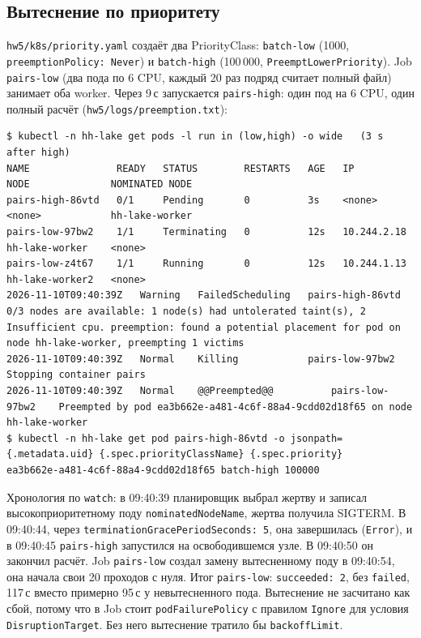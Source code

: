 \documentclass[11pt,a4paper]{article}
\DeclareRobustCommand{\code}[1]{\begingroup\renewcommand{\_}{\textunderscore\allowbreak}\renewcommand{\slash}{/\allowbreak}\texttt{#1}\endgroup}
\newcommand{\logf}[1]{\code{hw5\slash logs\slash #1}}
\begin{document}
\subsection{Вытеснение по приоритету}

\code{hw5/k8s/priority.yaml} создаёт два PriorityClass: \code{batch-low} (1000, \code{preemptionPolicy: Never}) и \code{batch-high} (100\,000, \code{PreemptLowerPriority}). Job \code{pairs-low} (два пода по 6 CPU, каждый 20 раз подряд считает полный файл) занимает оба worker. Через 9\,с запускается \code{pairs-high}: один под на 6 CPU, один полный расчёт (\logf{10\_preemption.txt}):
\begin{lstlisting}
$ kubectl -n hh-lake get pods -l run in (low,high) -o wide   (3 s after high)
NAME               READY   STATUS        RESTARTS   AGE   IP            NODE              NOMINATED NODE
pairs-high-86vtd   0/1     Pending       0          3s    <none>        <none>            hh-lake-worker
pairs-low-97bw2    1/1     Terminating   0          12s   10.244.2.18   hh-lake-worker    <none>
pairs-low-z4t67    1/1     Running       0          12s   10.244.1.13   hh-lake-worker2   <none>
2026-11-10T09:40:39Z   Warning   FailedScheduling   pairs-high-86vtd   0/3 nodes are available: 1 node(s) had untolerated taint(s), 2 Insufficient cpu. preemption: found a potential placement for pod on node hh-lake-worker, preempting 1 victims
2026-11-10T09:40:39Z   Normal    Killing            pairs-low-97bw2    Stopping container pairs
2026-11-10T09:40:39Z   Normal    @@Preempted@@          pairs-low-97bw2    Preempted by pod ea3b662e-a481-4c6f-88a4-9cdd02d18f65 on node hh-lake-worker
$ kubectl -n hh-lake get pod pairs-high-86vtd -o jsonpath={.metadata.uid} {.spec.priorityClassName} {.spec.priority}
ea3b662e-a481-4c6f-88a4-9cdd02d18f65 batch-high 100000
\end{lstlisting}
Хронология по \code{watch}: в 09:40:39 планировщик выбрал жертву и записал высокоприоритетному поду \code{nominatedNodeName}, жертва получила SIGTERM. В 09:40:44, через \code{terminationGracePeriodSeconds: 5}, она завершилась (\code{Error}), и в 09:40:45 \code{pairs-high} запустился на освободившемся узле. В 09:40:50 он закончил расчёт. Job \code{pairs-low} создал замену вытесненному поду в 09:40:54, она начала свои 20 проходов с нуля. Итог \code{pairs-low}: \code{succeeded: 2}, без \code{failed}, 117\,с вместо примерно 95\,с у невытесненного пода. Вытеснение не засчитано как сбой, потому что в Job стоит \code{podFailurePolicy} с правилом \code{Ignore} для условия \code{DisruptionTarget}. Без него вытеснение тратило бы \code{backoffLimit}.
\end{document}
